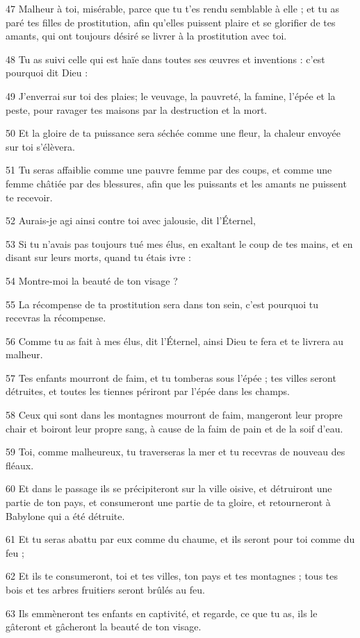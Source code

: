 \par 47 Malheur à toi, misérable, parce que tu t'es rendu semblable à elle ; et tu as paré tes filles de prostitution, afin qu'elles puissent plaire et se glorifier de tes amants, qui ont toujours désiré se livrer à la prostitution avec toi.
\par 48 Tu as suivi celle qui est haïe dans toutes ses œuvres et inventions : c'est pourquoi dit Dieu :
\par 49 J'enverrai sur toi des plaies; le veuvage, la pauvreté, la famine, l'épée et la peste, pour ravager tes maisons par la destruction et la mort.
\par 50 Et la gloire de ta puissance sera séchée comme une fleur, la chaleur envoyée sur toi s'élèvera.
\par 51 Tu seras affaiblie comme une pauvre femme par des coups, et comme une femme châtiée par des blessures, afin que les puissants et les amants ne puissent te recevoir.
\par 52 Aurais-je agi ainsi contre toi avec jalousie, dit l'Éternel,
\par 53 Si tu n'avais pas toujours tué mes élus, en exaltant le coup de tes mains, et en disant sur leurs morts, quand tu étais ivre :
\par 54 Montre-moi la beauté de ton visage ?
\par 55 La récompense de ta prostitution sera dans ton sein, c'est pourquoi tu recevras la récompense.
\par 56 Comme tu as fait à mes élus, dit l'Éternel, ainsi Dieu te fera et te livrera au malheur.
\par 57 Tes enfants mourront de faim, et tu tomberas sous l'épée ; tes villes seront détruites, et toutes les tiennes périront par l'épée dans les champs.
\par 58 Ceux qui sont dans les montagnes mourront de faim, mangeront leur propre chair et boiront leur propre sang, à cause de la faim de pain et de la soif d'eau.
\par 59 Toi, comme malheureux, tu traverseras la mer et tu recevras de nouveau des fléaux.
\par 60 Et dans le passage ils se précipiteront sur la ville oisive, et détruiront une partie de ton pays, et consumeront une partie de ta gloire, et retourneront à Babylone qui a été détruite.
\par 61 Et tu seras abattu par eux comme du chaume, et ils seront pour toi comme du feu ;
\par 62 Et ils te consumeront, toi et tes villes, ton pays et tes montagnes ; tous tes bois et tes arbres fruitiers seront brûlés au feu.
\par 63 Ils emmèneront tes enfants en captivité, et regarde, ce que tu as, ils le gâteront et gâcheront la beauté de ton visage.

